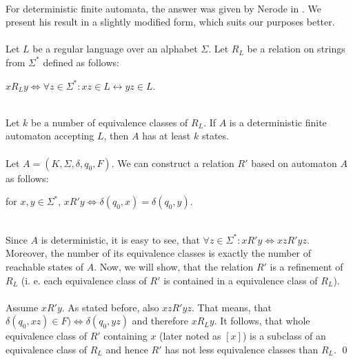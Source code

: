 \paragraph{}
For deterministic finite automata, the answer was given by Nerode in \cite{Nerode:LAT}. We present his result in a slightly modified form, which suits our purposes better.

\paragraph{}
\cveta Let $L$ be a regular language over an alphabet $\Sigma $. Let $R_{L}$ be a relation on strings from $\Sigma ^{*}$ defined as follows: \\
\centerline{$xR_{L}y \Leftrightarrow \forall z \in \Sigma ^{*}: xz \in L \leftrightarrow yz\in L$.}\\
Let $k$ be a number of equivalence classes of $R_{L}$. If $A$ is a deterministic finite automaton accepting $L$, then $A$ has at least $k$ states.

\paragraph{}
\dokaz Let $A = (K, \Sigma , \delta , q_{0}, F)$. We can construct a relation $R'$ based on automaton $A$ as follows: \\
\centerline{for $x, y \in \Sigma ^{*}$, $x R' y \Leftrightarrow \delta (q_{0}, x) = \delta (q_{0}, y)$.} \\
Since $A$ is deterministic, it is easy to see, that $\forall z \in \Sigma ^{*}: xR'y \Leftrightarrow xzR'yz$. Moreover, the number of its equivalence classes is exactly the number of reachable states of $A$. Now, we will show, that the relation $R'$ is a refinement of $R_{L}$ (i. e. each equivalence class of $R'$ is contained in a equivalence class of $R_{L}$).

\paragraph{}
Assume $xR'y$. As stated before, also $xzR'yz$. That means, that $\delta (q_{0}, xz) \in F) \Leftrightarrow \delta (q_{0}, yz)$ and therefore $xR_{L}y$. It follows, that whole equivalence class of $R'$ containing $x$ (later noted as $[x]$) is a subclass of an equivalence class of $R_{L}$ and hence $R'$ has not less equivalence classes than $R_{L}$. \qed

